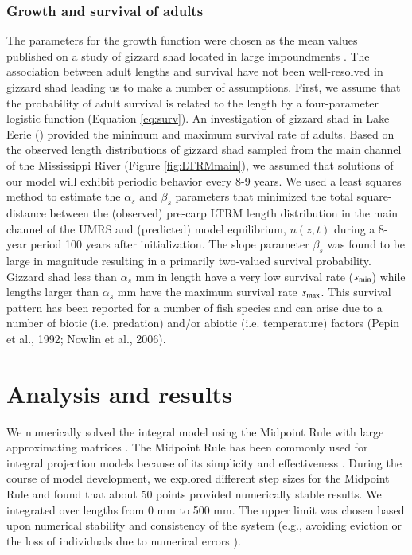 \documentclass[preprint,review,12pt,authoryear]{elsarticle}
\def\ds{\displaystyle}
\begin{document}
\subsubsection{Growth and survival of adults}
The parameters for the growth function were chosen as the mean values published on a study of gizzard shad located in large impoundments \citep{michaletz2017variation}. 
The association between adult lengths and survival have not been well-resolved in gizzard shad leading us to make a number of assumptions.  
First, we assume that the probability of adult survival is related to the length by a four-parameter logistic function (Equation \ref{eq:surv}).
An investigation of gizzard shad in Lake Eerie (\cite{bodola1955life}) provided the minimum and maximum survival rate of adults. 
Based on the observed length distributions of gizzard shad sampled from the main channel of the Mississippi River (Figure \ref{fig:LTRMmain}), we assumed that solutions of our model will exhibit periodic behavior every 8-9 years.   
We used a least squares method to estimate the $\alpha_s$ and $\beta_s$ parameters that 
minimized the total square-distance between the (observed) pre-carp LTRM length distribution in the main channel of the UMRS and (predicted) model equilibrium, $n(z,t)$ during a 8-year period 100 years after initialization.  
The slope parameter $\beta_s$ was found to be large in magnitude resulting in a primarily two-valued survival probability.  
Gizzard shad less than $\alpha_s$ mm in length have a very low survival rate ($\ds s_{\rm {min}}$) while lengths larger than  $\alpha_s$ mm have the maximum survival rate $\ds s_{\rm {max}}$. 
This survival pattern has been reported for a number of fish species and can arise due to a number of biotic (i.e. predation) and/or abiotic (i.e. temperature) factors (Pepin et al., 1992; Nowlin et al., 2006). 
\section{Analysis and results}
We numerically solved the integral model using the Midpoint Rule with large approximating matrices \citep{burden2005numerical}. 
The Midpoint Rule has been commonly used for integral projection models because of its simplicity and effectiveness \citep{ellner2006integral, ramula2009integral,  merow2014advancing}. 
During the course of model development, we explored different step sizes for the Midpoint Rule and found that about 50 points provided numerically stable results. 
We integrated over lengths from 0 mm to 500 mm. 
The upper limit was chosen based upon numerical stability and consistency of the system (e.g., avoiding eviction or the loss of individuals due to numerical errors \citep{williams2012avoiding}). 
\end{document}
